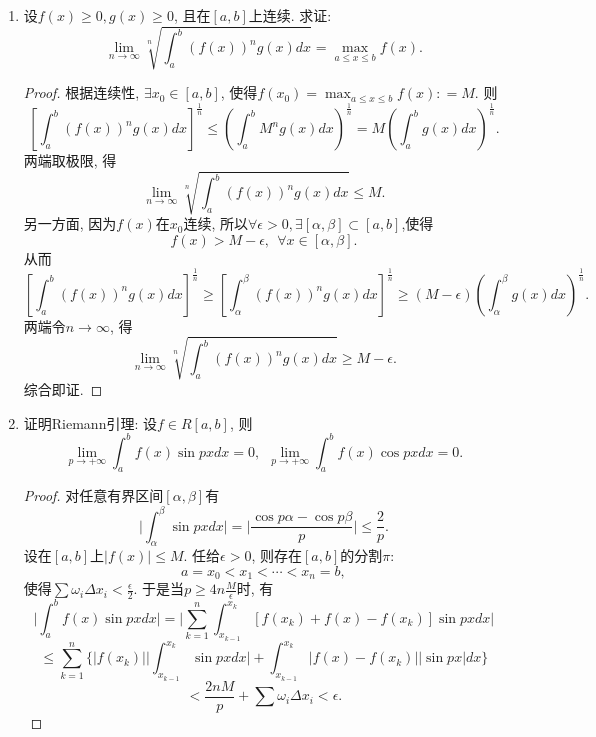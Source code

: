 \documentclass[UTF8,11pt, a4paper, oneside, fontset=none]{ctexbook}
\begin{document}
\begin{enumerate}
\begin{proof}
\end{proof}



\item 设$f(x) \geq 0, g(x) \geq 0$, 且在$[a, b]$上连续. 求证: 
\[
\lim_{n \to \infty} \sqrt[n]{\int_a^b (f(x))^n g(x) dx } = \max_{a \leq x \leq b} f(x).
\]

\begin{proof}

根据连续性, $\exists x_0 \in [a, b]$, 使得$f(x_0) =  \max_{a \leq x \leq b} f(x) : = M$. 则
\[
\left[ \int_a^b (f(x))^n g(x) dx \right]^{\frac{1}{n}} \leq \left( \int_a^b M^n g(x) dx \right)^{\frac{1}{n}} = M \left( \int_a^b g(x) dx \right)^{\frac{1}{n}}.
\]
两端取极限, 得
\[
\lim_{n \to \infty} \sqrt[n]{\int_a^b (f(x))^n g(x) dx } \leq M.
\]
另一方面, 因为$f(x)$在$x_0$连续, 所以$\forall \epsilon >0, \exists [\alpha, \beta] \subset [a, b]$,使得
\[
f(x) > M - \epsilon, \ \ \forall x \in [\alpha, \beta].
\]
从而
\[
\left[ \int_a^b (f(x))^n g(x) dx \right]^{\frac{1}{n}}  \geq \left[ \int_{\alpha}^{\beta} (f(x))^n g(x) dx \right]^{\frac{1}{n}} \geq (M - \epsilon ) \left( \int_{\alpha}^{\beta} g(x) dx \right)^{\frac{1}{n}}.
\]
两端令$n \to \infty$, 得
\[
\lim_{n \to \infty} \sqrt[n]{\int_a^b (f(x))^n g(x) dx } \geq M- \epsilon.
\]
综合即证.

\end{proof}


\item 证明Riemann引理:
设$f \in R[a, b]$, 则
\[
\lim_{p \to +\infty} \int_a^b f(x) \sin px dx = 0, \ \ \lim_{p \to +\infty} \int_a^b f(x) \cos px dx = 0.
\]

\begin{proof}


对任意有界区间$[\alpha, \beta]$有
\[
\Big| \int_{\alpha}^{\beta} \sin px dx \Big| = \Big| \frac{\cos p \alpha - \cos p \beta}{p} \Big| \leq \frac{2}{p}.
\]
设在$[a, b]$上$|f(x) | \leq M$. 任给$\epsilon >0$, 则存在$[a, b]$的分割$\pi$:
\[
a = x_0 < x_1 < \cdots < x_n =b,
\]
使得$\sum \omega_i \Delta x_i < \frac{\epsilon}{2}$. 于是当$p \geq 4n \frac{M}{\epsilon}$时, 有
\[
\Big| \int_a^b f(x) \sin px dx \Big| = \Big| \sum_{k=1}^n \int_{x_{k-1}}^{x_k} [f(x_k)  + f(x) - f(x_k)]\sin px dx \Big|
\]
\[
\leq \sum_{k=1}^n \{ |f(x_k)| \Big| \int_{x_{k-1}}^{x_k} \sin px dx \Big| + \int_{x_{k-1}}^{x_k} |f(x) - f(x_k)| |\sin px| dx \}
\]
\[
< \frac{2nM}{p} +  \sum \omega_i \Delta x_i  < \epsilon.
\]

\end{proof}



\end{enumerate}
\end{document}

